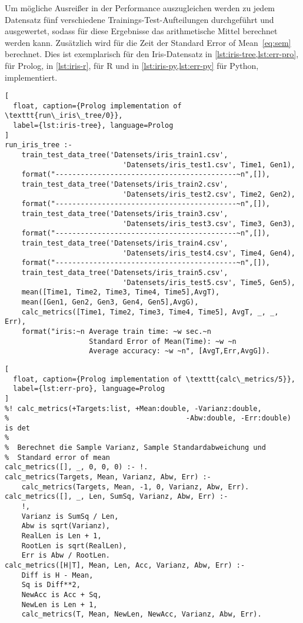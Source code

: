 Um mögliche Ausreißer in der Performance auszugleichen werden zu jedem Datensatz fünf
verschiedene Trainings-Test-Aufteilungen durchgeführt und ausgewertet, sodass für diese
Ergebnisse das arithmetische Mittel berechnet werden kann.
Zusätzlich wird für die Zeit der Standard Error of Mean~\cref{eq:sem} berechnet.
Dies ist exemplarisch für den Iris-Datensatz in \cref{lst:iris-tree,lst:err-pro}, für Prolog,
in \cref{lst:iris-r}, für R und in \cref{lst:iris-py,lst:err-py} für Python, implementiert.
\begin{lstlisting}[
  float, caption={Prolog implementation of \texttt{run\_iris\_tree/0}},
  label={lst:iris-tree}, language=Prolog
]
run_iris_tree :-
    train_test_data_tree('Datensets/iris_train1.csv',
                            'Datensets/iris_test1.csv', Time1, Gen1),
    format("-------------------------------------------~n",[]),
    train_test_data_tree('Datensets/iris_train2.csv',
                            'Datensets/iris_test2.csv', Time2, Gen2),
    format("-------------------------------------------~n",[]),
    train_test_data_tree('Datensets/iris_train3.csv',
                            'Datensets/iris_test3.csv', Time3, Gen3),
    format("-------------------------------------------~n",[]),
    train_test_data_tree('Datensets/iris_train4.csv',
                            'Datensets/iris_test4.csv', Time4, Gen4),
    format("-------------------------------------------~n",[]),
    train_test_data_tree('Datensets/iris_train5.csv',
                            'Datensets/iris_test5.csv', Time5, Gen5),
    mean([Time1, Time2, Time3, Time4, Time5],AvgT),
    mean([Gen1, Gen2, Gen3, Gen4, Gen5],AvgG),
    calc_metrics([Time1, Time2, Time3, Time4, Time5], AvgT, _, _, Err),
    format("iris:~n Average train time: ~w sec.~n
                    Standard Error of Mean(Time): ~w ~n
                    Average accuracy: ~w ~n", [AvgT,Err,AvgG]).
\end{lstlisting}
\begin{lstlisting}[
  float, caption={Prolog implementation of \texttt{calc\_metrics/5}},
  label={lst:err-pro}, language=Prolog
]
%! calc_metrics(+Targets:list, +Mean:double, -Varianz:double,
%                                          -Abw:double, -Err:double) is det
%
%  Berechnet die Sample Varianz, Sample Standardabweichung und
%  Standard error of mean
calc_metrics([], _, 0, 0, 0) :- !.
calc_metrics(Targets, Mean, Varianz, Abw, Err) :-
    calc_metrics(Targets, Mean, -1, 0, Varianz, Abw, Err).
calc_metrics([], _, Len, SumSq, Varianz, Abw, Err) :- 
    !,
    Varianz is SumSq / Len,
    Abw is sqrt(Varianz),
    RealLen is Len + 1,
    RootLen is sqrt(RealLen),
    Err is Abw / RootLen.
calc_metrics([H|T], Mean, Len, Acc, Varianz, Abw, Err) :-
    Diff is H - Mean,
    Sq is Diff**2,
    NewAcc is Acc + Sq,
    NewLen is Len + 1,
    calc_metrics(T, Mean, NewLen, NewAcc, Varianz, Abw, Err).
\end{lstlisting}



